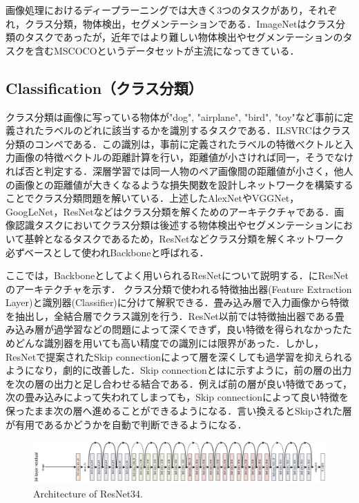 画像処理におけるディープラーニングでは大きく3つのタスクがあり，それぞれ，クラス分類，物体検出，セグメンテーションである．ImageNetはクラス分類のタスクであったが，近年ではより難しい物体検出やセグメンテーションのタスクを含むMSCOCOというデータセットが主流になってきている．


\subsection{Classification（クラス分類）}
クラス分類は画像に写っている物体が"dog", "airplane", "bird", "toy"など事前に定義されたラベルのどれに該当するかを識別するタスクである．ILSVRCはクラス分類のコンペである．この識別は，事前に定義されたラベルの特徴べクトルと入力画像の特徴べクトルの距離計算を行い，距離値が小さければ同一，そうでなければ否と判定する．深層学習では同一人物のペア画像間の距離値が小さく，他人の画像との距離値が大きくなるような損失関数を設計しネットワークを構築することでクラス分類問題を解いている．上述したAlexNetやVGGNet，GoogLeNet，ResNetなどはクラス分類を解くためのアーキテクチャである．画像認識タスクにおいてクラス分類は後述する物体検出やセグメンテーションにおいて基幹となるタスクであるため，ResNetなどクラス分類を解くネットワーク必ずベースとして使われBackboneと呼ばれる．

ここでは，Backboneとしてよく用いられるResNetについて説明する．にResNetのアーキテクチャを示す．
クラス分類で使われる特徴抽出器(Feature Extraction Layer)と識別器(Classifier)に分けて解釈できる．畳み込み層で入力画像から特徴を抽出し，全結合層でクラス識別を行う．ResNet以前では特徴抽出器である畳み込み層が過学習などの問題によって深くできず，良い特徴を得られなかったためどんな識別器を用いても高い精度での識別には限界があった．しかし，ResNetで提案されたSkip connectionによって層を深くしても過学習を抑えられるようになり，劇的に改善した．Skip connectionとはに示すように，前の層の出力を次の層の出力と足し合わせる結合である．例えば前の層が良い特徴であって，次の畳み込みによって失われてしまっても，Skip connectionによって良い特徴を保ったまま次の層へ進めることができるようになる．言い換えるとSkipされた層が有用であるかどうかを自動で判断できるようになる．

\begin{figure}
    \centering
    \includegraphics[width=\linewidth]{figure/chapter2/resnet34}
    \caption[Architecture of ResNet34. ]{Architecture of ResNet34\cite{ResNet}. }
    \label{fig:ResNet}
\end{figure}


